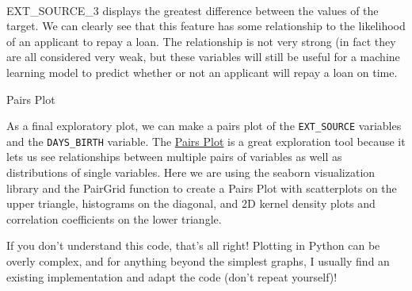 \documentclass[11pt]{article}
\begin{document}
    \begin{center}
    \end{center}
    { \hspace*{\fill} \\}
    
    EXT\_SOURCE\_3 displays the greatest difference between the values of
the target. We can clearly see that this feature has some relationship
to the likelihood of an applicant to repay a loan. The relationship is
not very strong (in fact they are all considered very weak, but these
variables will still be useful for a machine learning model to predict
whether or not an applicant will repay a loan on time.

    Pairs Plot

    As a final exploratory plot, we can make a pairs plot of the
\texttt{EXT\_SOURCE} variables and the \texttt{DAYS\_BIRTH} variable.
The
\href{https://towardsdatascience.com/visualizing-data-with-pair-plots-in-python-f228cf529166}{Pairs
Plot} is a great exploration tool because it lets us see relationships
between multiple pairs of variables as well as distributions of single
variables. Here we are using the seaborn visualization library and the
PairGrid function to create a Pairs Plot with scatterplots on the upper
triangle, histograms on the diagonal, and 2D kernel density plots and
correlation coefficients on the lower triangle.

If you don't understand this code, that's all right! Plotting in Python
can be overly complex, and for anything beyond the simplest graphs, I
usually find an existing implementation and adapt the code (don't repeat
yourself)!
\end{document}
